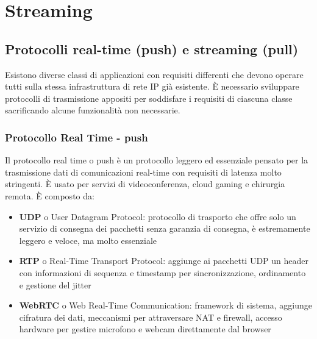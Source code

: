 \section{Streaming}
\subsection{Protocolli real-time (push) e streaming (pull)}
Esistono diverse classi di applicazioni con requisiti differenti che devono operare tutti sulla stessa infrastruttura di
rete IP già esistente. È necessario sviluppare protocolli di trasmissione appositi per soddisfare i requisiti di ciascuna
classe sacrificando alcune funzionalità non necessarie.

\subsubsection*{Protocollo Real Time - push}
Il protocollo real time o push è un protocollo leggero ed essenziale pensato per la trasmissione dati di comunicazioni
real-time con requisiti di latenza molto stringenti. È usato per servizi di videoconferenza, cloud gaming e chirurgia
remota. È composto da:
\begin{itemize}
	\item \textbf{UDP} o User Datagram Protocol: protocollo di trasporto che offre solo un servizio di consegna dei pacchetti
	senza garanzia di consegna, è estremamente leggero e veloce, ma molto essenziale
	\item \textbf{RTP} o Real-Time Transport Protocol: aggiunge ai pacchetti UDP un header con informazioni di sequenza e
	timestamp per sincronizzazione, ordinamento e gestione del jitter
	\item \textbf{WebRTC} o Web Real-Time Communication: framework di sistema, aggiunge cifratura dei dati, meccanismi per
	attraversare NAT e firewall, accesso hardware per gestire microfono e webcam direttamente dal browser
\end{itemize}

